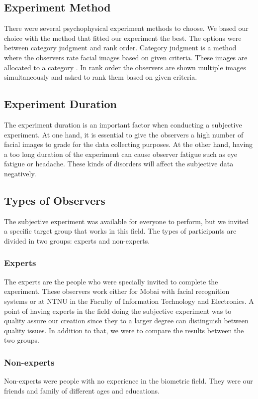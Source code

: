 \subsection{Experiment Method}
There were several psychophysical experiment methods to choose. We based our choice with the method that fitted our experiment the best. The options were between category judgment and rank order. Category judgment is a method where the observers rate facial images based on given criteria. These images are allocated to a category \cite{Xphdthesis}. In rank order the observers are shown multiple images simultaneously and asked to rank them based on given criteria. 

\subsection{Experiment Duration}
The experiment duration is an important factor when conducting a subjective experiment. At one hand, it is essential to give the observers a high number of facial images to grade for the data collecting purposes. At the other hand, having a too long duration of the experiment can cause observer fatigue such as eye fatigue or headache. These kinds of disorders will affect the subjective data negatively.  

\subsection{Types of Observers}
The subjective experiment was available for everyone to perform, but we invited a specific target group that works in this field. The types of participants are divided in two groups: experts and non-experts.

\subsubsection*{Experts}
The experts are the people who were specially invited to complete the experiment. These observers work either for Mobai with facial recognition systems or at NTNU in the Faculty of Information Technology and Electronics. A point of having experts in the field doing the subjective experiment was to quality assure our creation since they to a larger degree can distinguish between quality issues. In addition to that, we were to compare the results between the two groups. 

\subsubsection*{Non-experts}
Non-experts were people with no experience in the biometric field. They were our friends and family of different ages and educations.

